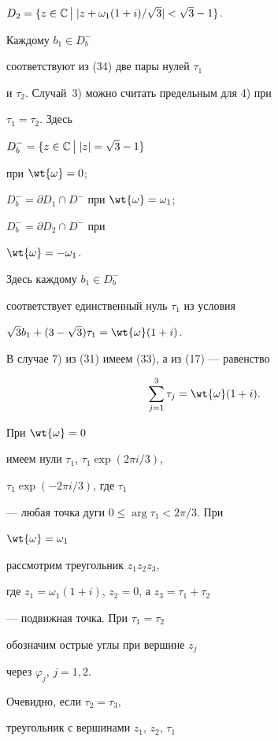 $D_{2}=\{z\in \Bbb C\,\big|\; |z+\omega_{1}(1+i)/\sqrt{3}|<\sqrt{3}-1 \}$.





\noindent{}Каждому $b_1 \in D^{-}_{b}$


соответствуют из (34) две пары нулей $\tau_1$


и $\tau_2$. Случай~3) можно считать предельным для 4) при


$\tau_1 = \tau_2$. Здесь


$D^{-}_{b} = \{ z\in \Bbb C\,\big|\;|z| = \sqrt{3}-1 \}$


при $\wt{\omega} =0$;


$D^{-}_{b}=\partial D_{1}\cap D^{-}$ при $\wt{\omega}= \omega_1$;


$D^{-}_{b}=\partial D_{2}\cap D^{-}$ при


$\wt{\omega}= - \omega_1$.


Здесь каждому $b_1 \in D^{-}_{b}$


соответствует единственный нуль $\tau_1$ из условия


$\sqrt{3}b_1 +(3-\sqrt{3})\tau_1 =\wt{\omega}(1+i)$.





В случае 7) из (31) имеем (33), а из (17) --- равенство


\begin{equation}


\sum_{j=1}^{3}\tau_j = \wt{\omega} (1+i).


\end{equation}


При $\wt{\omega} = 0$


имеем нули $\tau_1$, $\tau_1\exp (2\pi i/3)$,


$\tau_1\exp (-2\pi i/3)$, где $\tau_1$


--- любая точка дуги $0\le\arg \tau_1 < 2\pi/3$. При


$\wt{\omega}= \omega_1$


рассмотрим треугольник $z_{1}z_{2}z_{3}$,


где $z_1 =\omega_1 (1+i)$, $z_2 =0$, а $z_3= \tau_1 +\tau_2$


--- подвижная точка. При $\tau_1 = \tau_2$


обозначим острые углы при вершине $z_j$


через $\varphi _{j}$, $j=1,2$.


Очевидно, если $\tau_2 =\tau_3$,


треугольник с вершинами $z_1$, $z_2$, $\tau_1$



